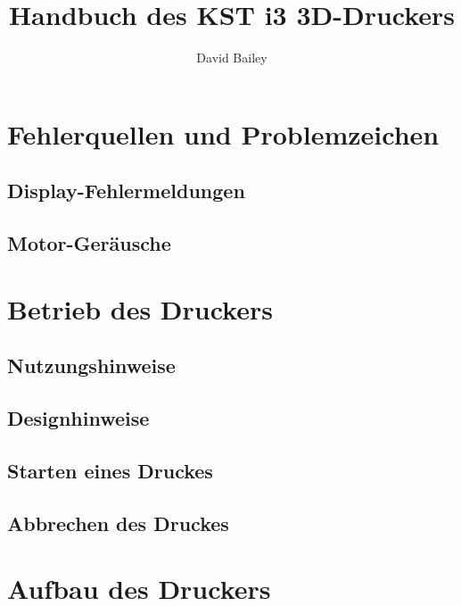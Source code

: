 \documentclass[11pt,a4paper]{article}
\title{Handbuch des KST i3 3D-Druckers}
\author{David Bailey}
\begin{document}
\maketitle
\newpage

\tableofcontents

\section{Fehlerquellen und Problemzeichen}
\subsection{Display-Fehlermeldungen}
\subsection{Motor-Geräusche}

\section{Betrieb des Druckers}
\subsection{Nutzungshinweise}
\subsection{Designhinweise}
\subsection{Starten eines Druckes}
\subsection{Abbrechen des Druckes}

\section{Aufbau des Druckers}
\end{document}

